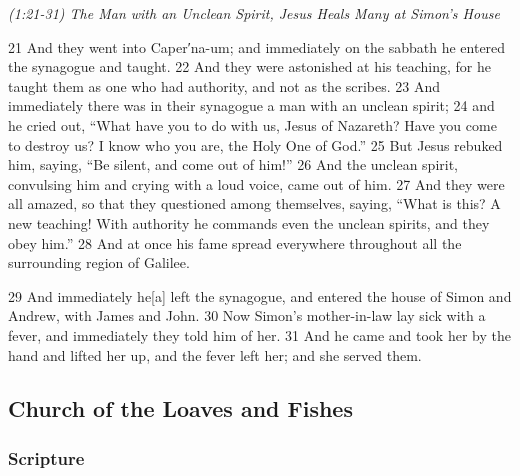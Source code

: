 \documentclass[letterpaper]{report}
\begin{document}
{\centering
	\emph{(1:21-31) The Man with an Unclean Spirit,
		Jesus Heals Many at Simon’s House}\\
}
\begin{multicols}{2}
21 And they went into Caper′na-um; and immediately on the sabbath he entered the synagogue and taught. 22 And they were astonished at his teaching, for he taught them as one who had authority, and not as the scribes. 23 And immediately there was in their synagogue a man with an unclean spirit; 24 and he cried out, “What have you to do with us, Jesus of Nazareth? Have you come to destroy us? I know who you are, the Holy One of God.” 25 But Jesus rebuked him, saying, “Be silent, and come out of him!” 26 And the unclean spirit, convulsing him and crying with a loud voice, came out of him. 27 And they were all amazed, so that they questioned among themselves, saying, “What is this? A new teaching! With authority he commands even the unclean spirits, and they obey him.” 28 And at once his fame spread everywhere throughout all the surrounding region of Galilee.

29 And immediately he[a] left the synagogue, and entered the house of Simon and Andrew, with James and John. 30 Now Simon’s mother-in-law lay sick with a fever, and immediately they told him of her. 31 And he came and took her by the hand and lifted her up, and the fever left her; and she served them.
\end{multicols}

\clearpage
\subsection{Church of the Loaves and Fishes}
\begin{multicols}{2}
	\mbox{}
\end{multicols}
\subsubsection{Scripture}
\end{document}
